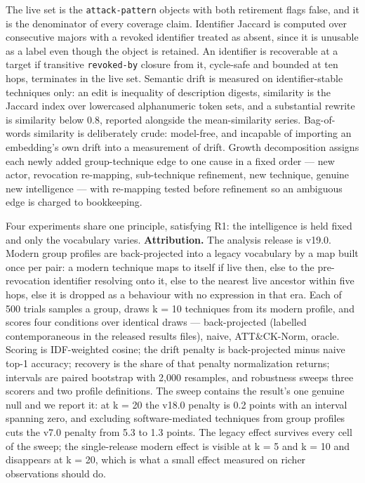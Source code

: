 \documentclass[11pt,a4paper]{article}
\begin{document}
The live set is the \texttt{attack-pattern} objects with both retirement flags false, and it is the denominator of every coverage claim. Identifier Jaccard is computed over consecutive majors with a revoked identifier treated as absent, since it is unusable as a label even though the object is retained. An identifier is recoverable at a target if transitive \texttt{revoked-by} closure from it, cycle-safe and bounded at ten hops, terminates in the live set. Semantic drift is measured on identifier-stable techniques only: an edit is inequality of description digests, similarity is the Jaccard index over lowercased alphanumeric token sets, and a substantial rewrite is similarity below 0.8, reported alongside the mean-similarity series. Bag-of-words similarity is deliberately crude: model-free, and incapable of importing an embedding's own drift into a measurement of drift. Growth decomposition assigns each newly added group-technique edge to one cause in a fixed order — new actor, revocation re-mapping, sub-technique refinement, new technique, genuine new intelligence — with re-mapping tested before refinement so an ambiguous edge is charged to bookkeeping.

Four experiments share one principle, satisfying R1: the intelligence is held fixed and only the vocabulary varies. \textbf{Attribution.} The analysis release is v19.0. Modern group profiles are back-projected into a legacy vocabulary by a map built once per pair: a modern technique maps to itself if live then, else to the pre-revocation identifier resolving onto it, else to the nearest live ancestor within five hops, else it is dropped as a behaviour with no expression in that era. Each of 500 trials samples a group, draws k = 10 techniques from its modern profile, and scores four conditions over identical draws — back-projected (labelled contemporaneous in the released results files), naive, ATT\&CK-Norm, oracle. Scoring is IDF-weighted cosine; the drift penalty is back-projected minus naive top-1 accuracy; recovery is the share of that penalty normalization returns; intervals are paired bootstrap with 2,000 resamples, and robustness sweeps three scorers and two profile definitions. The sweep contains the result's one genuine null and we report it: at k = 20 the v18.0 penalty is 0.2 points with an interval spanning zero, and excluding software-mediated techniques from group profiles cuts the v7.0 penalty from 5.3 to 1.3 points. The legacy effect survives every cell of the sweep; the single-release modern effect is visible at k = 5 and k = 10 and disappears at k = 20, which is what a small effect measured on richer observations should do.
\end{document}
